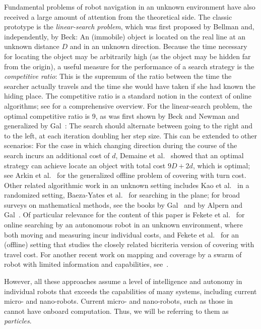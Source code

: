 Fundamental problems of robot navigation in an unknown environment have also received a large amount of attention from the theoretical side.
The classic prototype is the {\em linear-search problem}, which was first proposed by Bellman \cite{B63} and, independently,
by Beck\cite{B64}: An (immobile) object is located on the real line at an unknown distance $D$ and in an unknown direction.
Because the time necessary for locating the object may be arbitrarily high (as the object may be hidden far
from the origin), a useful measure for the performance of a search strategy
is the {\em competitive ratio}: This is the supremum of the ratio
between the time the searcher actually travels and the time she would have
taken if she had known the hiding place. 
 The competitive ratio is
a standard notion in the context of online algorithms; see \cite{FW98}
for a comprehensive overview. 
For the linear-search problem, the optimal competitive ratio is 9,
as was first shown by Beck and Newman \cite{BN70} and generalized by Gal~\cite{G72,G74}: The search should alternate
between going to the right and to the left, at each iteration doubling
her step size. This can be extended to other scenarios: For the case in which changing direction during the course 
of the search incurs an additional cost of $d$, Demaine et al.~\cite{dfg-olstc-06} showed that an optimal strategy can achieve
locate an object with total cost $9D+2d$, which is optimal; see Arkin et al.~\cite{abd+-octtc-05} for the generalized
offline problem of covering with turn cost. Other related algorithmic work in an unknown setting includes Kao et al.~\cite{KRT96}
in a randomized setting, Baeza-Yates et al.~\cite{BCR93} for searching in the plane; for broad surveys on mathematical
methods, see the books by Gal~\cite{G80} and by Alpern and Gal~\cite{AG03}.
Of particular relevance for the content of this paper is 
Fekete et al.~\cite{fkn-sar-04,fkn-osar-06} for online searching by an autonomous robot in an unknown environment,
where both moving and measuring incur individual costs, and Fekete et al.~\cite{fms-mctc-10} for an (offline)
setting that studies the closely related bicriteria version of covering with travel cost.
For another recent work on mapping and coverage by a swarm of robot with limited information and capabilities, see~\cite{lfm-stmrs-16}.

However, all these approaches assume a level of intelligence and autonomy in individual robots that exceeds the capabilities of many systems, including current micro- and nano-robots.  Current micro- and nano-robots, such as those in~\cite{Chowdhury2015,martel2015magnetotactic,Xiaohui2015magnetiteMicroswimmers} cannot have onboard computation. Thus, we will be referring to them as {\em particles}.

